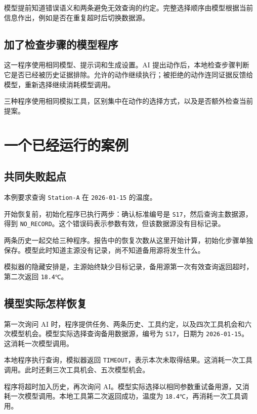 \documentclass[12pt,a4paper,UTF8,fontset=none]{ctexart}
\begin{document}
模型提前知道错误语义和两条避免无效查询的约定。完整选择顺序由模型根据当前信息作出，例如是否在重复超时后切换数据源。


\subsection{加了检查步骤的模型程序}

这一程序使用相同模型、提示词和生成设置。AI 提出动作后，本地检查步骤判断它是否已经被历史证据排除。允许的动作继续执行；被拒绝的动作连同证据反馈给模型，重新选择继续消耗模型调用。


三种程序使用相同模拟工具，区别集中在动作的选择方式，以及是否额外检查当前提案。


\section{一个已经运行的案例}

\subsection{共同失败起点}

本例要求查询 \texttt{Station-\allowbreak{}A} 在 \texttt{2026-\allowbreak{}01-\allowbreak{}15} 的温度。


开始恢复前，初始化程序已执行两步：确认标准编号是 \texttt{S17}，然后查询主数据源，得到 \texttt{NO\_RECORD}。这个错误码表示参数有效，但该数据源没有目标记录。


两条历史一起交给三种程序。报告中的恢复次数从这里开始计算，初始化步骤单独保存。模型此时知道主源没有记录，尚不知道备用源将发生什么。


模拟器的隐藏安排是，主源始终缺少目标记录，备用源第一次有效查询返回超时，第二次返回 \texttt{18.4℃}。


\subsection{模型实际怎样恢复}

第一次询问 AI 时，程序提供任务、两条历史、工具约定，以及四次工具机会和六次模型机会。模型实际选择查询备用数据源，编号为 \texttt{S17}，日期为 \texttt{2026-\allowbreak{}01-\allowbreak{}15}。这消耗一次模型调用。


本地程序执行查询，模拟器返回 \texttt{TIMEOUT}，表示本次未取得结果。这消耗一次工具调用。此时还剩三次工具机会、五次模型机会。


程序将超时加入历史，再次询问 AI。模型实际选择以相同参数重试备用源，又消耗一次模型调用。本地工具第二次返回成功，温度为 \texttt{18.4℃}，再消耗一次工具调用。
\end{document}
